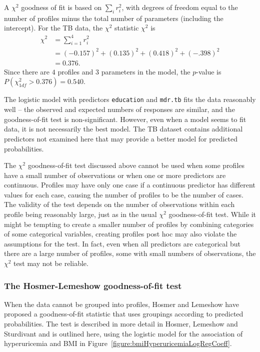  A $\chi^2$ goodness of fit is based on $\sum_i r_i^2$, with degrees of freedom equal to the number of profiles minus the total number of parameters (including the intercept).  For the TB data, the $\chi^2$ statistic $\chi^2$ is
\begin{align*}
   \chi^2 &= \sum_{i = 1}^4 r_i^2 \\
       &= (-0.157)^2 + (0.135)^2 + (0.418)^2 + (-.398)^2 \\
       &= 0.376.
\end{align*}
Since there are $4$ profiles and $3$ parameters in the model, the $p$-value is $P(\chi^2_{1df} > 0.376) = 0.540$.

The logistic model with predictors \texttt{education} and \texttt{mdr.tb}  fits the data reasonably well -- the observed and expected numbers of responses are similar, and the goodness-of-fit test is non-significant.  However, even when a model seems to fit data, it is not necessarily the best model. The TB dataset contains additional predictors not examined here that may provide a better model for predicted probabilities.

The $\chi^2$ goodness-of-fit test discussed above cannot be used when some profiles have a small number of observations or when one or more predictors are continuous.  Profiles may have only one case if a continuous predictor has different values for each case, causing the number of profiles to be the number of cases.  The validity of the test depends on the number of observations within each profile being reasonably large, just as in the usual $\chi^2$ goodness-of-fit test.  While it might be tempting to create a smaller number of profiles by combining categories of some categorical variables, creating profiles post hoc may also violate the assumptions for the test.  In fact, even when all predictors are categorical but there are a large number of profiles, some with small numbers of observations, the $\chi^2$ test may not be reliable.

\subsubsection{The Hosmer-Lemeshow goodness-of-fit test}

 When the data cannot be grouped into profiles, Hosmer and Lemeshow have proposed a goodness-of-fit statistic that uses groupings according to predicted probabilities.   The test is described in more detail in Hosmer, Lemeshow and Sturdivant and is outlined here, using the logistic model for the association of hyperuricemia and BMI in Figure~\ref{figure:bmiHyperuricemiaLogRegCoeff}.

